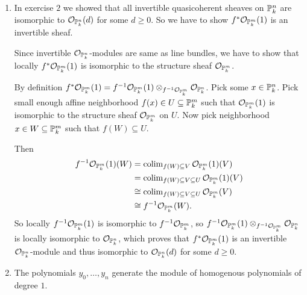 \begin{exercise}{3}
    \begin{enumerate}
        \item{In exercise $2$ we showed that all invertible quasicoherent
            sheaves on $\mathbb{P}^n_k$ are isomorphic to
            $\mathcal{O}_{\mathbb{P}^n_k}(d)$ for some $d \geq 0$. So we have to show
            $f^* \mathcal{O}_{\mathbb{P}^m_k}(1)$ is an invertible sheaf.

            Since invertible $\mathcal{O}_{\mathbb{P}^n_k}$-modules are same as line
            bundles, we have to show that locally $f^*
            \mathcal{O}_{\mathbb{P}^m_k}(1)$ is isomorphic to the structure sheaf
            $\mathcal{O}_{\mathbb{P}^m_k}$.

            By definition $f^* \mathcal{O}_{\mathbb{P}^m_k}(1) = f^{-1}
            \mathcal{O}_{\mathbb{P}^m_k}(1) \otimes_{f^{-1} \mathcal{O}_{\mathbb{P}^m_k}}
            \mathcal{O}_{\mathbb{P}^n_k}$. Pick some $x \in \mathbb{P}^n_k$. Pick small
            enough affine neighborhood $f(x) \in U \subseteq \mathbb{P}^m_k$ such that
            $\mathcal{O}_{\mathbb{P}^m_k} (1)$ is isomorphic to the structure sheaf
            $\mathcal{O}_{\mathbb{P}^m_k}$ on $U$. Now pick neighborhood $x \in W \subseteq \mathbb{P}^m_k$
            such that $f(W) \subseteq U$.

            Then 
            \begin{align*}
                f^{-1} \mathcal{O}_{\mathbb{P}^m_k}(1) (W) &= \operatorname{colim}_{f(W) \subseteq
                V} \mathcal{O}_{\mathbb{P}^m_k} (1) (V) \\
                &= \operatorname{colim}_{f(W) \subseteq V \subseteq U} \mathcal{O}_{\mathbb{P}^m_k}
                (1) (V) \\
                &\cong \operatorname{colim}_{f(W) \subseteq V \subseteq U} \mathcal{O}_{\mathbb{P}^m_k}
                (V) \\
                &\cong f^{-1} \mathcal{O}_{\mathbb{P}^m_k} (W).
            \end{align*}
            So locally $f^{-1} \mathcal{O}_{\mathbb{P}^m_k}(1)$ is isomorphic to
            $f^{-1} \mathcal{O}_{\mathbb{P}^m_k}$, so $f^{-1}
            \mathcal{O}_{\mathbb{P}^m_k}(1) \otimes_{f^{-1} \mathcal{O}_{\mathbb{P}^m_k}}
            \mathcal{O}_{\mathbb{P}^n_k}$ is locally isomorphic to
            $\mathcal{O}_{\mathbb{P}^n_k}$, which proves that $f^*
            \mathcal{O}_{\mathbb{P}^m_k}(1)$ is an invertible
            $\mathcal{O}_{\mathbb{P}^n_k}$-module and thus isomorphic to
            $\mathcal{O}_{\mathbb{P}^n_k}(d)$ for some $d \geq 0$.
            }
        \item{The polynomials $y_0, \dots, y_n$ generate the module of
            homogenous polynomials of degree $1$.
            }
    \end{enumerate}
\end{exercise}

